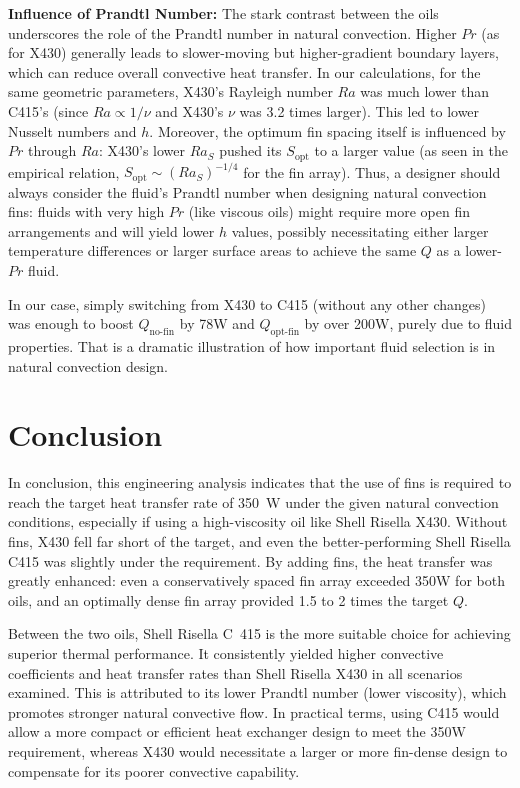 \documentclass[12pt]{article}
\begin{document}
\textbf{Influence of Prandtl Number:} The stark contrast between the oils underscores the role of the Prandtl number in natural convection. Higher $Pr$ (as for X430) generally leads to slower-moving but higher-gradient boundary layers, which can reduce overall convective heat transfer. In our calculations, for the same geometric parameters, X430’s Rayleigh number $Ra$ was much lower than C415’s (since $Ra \propto 1/\nu$ and X430’s $\nu$ was 3.2 times larger). This led to lower Nusselt numbers and $h$. Moreover, the optimum fin spacing itself is influenced by $Pr$ through $Ra$: X430’s lower $Ra_S$ pushed its $S_{\text{opt}}$ to a larger value (as seen in the empirical relation, $S_{\text{opt}} \sim (Ra_S)^{-1/4}$ for the fin array). Thus, a designer should always consider the fluid’s Prandtl number when designing natural convection fins: fluids with very high $Pr$ (like viscous oils) might require more open fin arrangements and will yield lower $h$ values, possibly necessitating either larger temperature differences or larger surface areas to achieve the same $Q$ as a lower-$Pr$ fluid.

In our case, simply switching from X430 to C415 (without any other changes) was enough to boost $Q_{\text{no-fin}}$ by 78W and $Q_{\text{opt-fin}}$ by over 200W, purely due to fluid properties. That is a dramatic illustration of how important fluid selection is in natural convection design.

\section{Conclusion}
In conclusion, this engineering analysis indicates that the use of fins is required to reach the target heat transfer rate of 350~W under the given natural convection conditions, especially if using a high-viscosity oil like Shell Risella X430. Without fins, X430 fell far short of the target, and even the better-performing Shell Risella C415 was slightly under the requirement. By adding fins, the heat transfer was greatly enhanced: even a conservatively spaced fin array exceeded 350W for both oils, and an optimally dense fin array provided 1.5 to 2 times the target $Q$.

Between the two oils, Shell Risella C~415 is the more suitable choice for achieving superior thermal performance. It consistently yielded higher convective coefficients and heat transfer rates than Shell Risella X430 in all scenarios examined. This is attributed to its lower Prandtl number (lower viscosity), which promotes stronger natural convective flow. In practical terms, using C415 would allow a more compact or efficient heat exchanger design to meet the 350W requirement, whereas X430 would necessitate a larger or more fin-dense design to compensate for its poorer convective capability.
\end{document}
